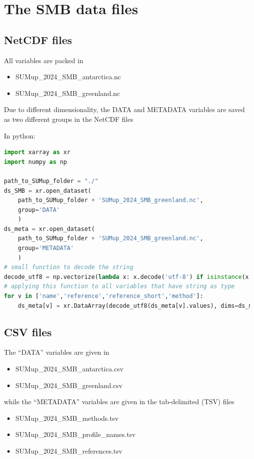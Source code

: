\documentclass[journal abbreviation, manuscript]{copernicus}
\begin{document}


\section{The SMB data files}
\subsection{NetCDF files}

All variables are packed in 

\begin{itemize}
\item SUMup\_2024\_SMB\_antarctica.nc
\item SUMup\_2024\_SMB\_greenland.nc
\end{itemize}
Due to different dimensionality, the DATA and METADATA variables are saved as two different groups in the NetCDF files

In python:
\begin{lstlisting}[language=python]
import xarray as xr
import numpy as np

path_to_SUMup_folder = "./"
ds_SMB = xr.open_dataset(
    path_to_SUMup_folder + 'SUMup_2024_SMB_greenland.nc', 
    group='DATA'
    )
ds_meta = xr.open_dataset(
    path_to_SUMup_folder + 'SUMup_2024_SMB_greenland.nc',
    group='METADATA'
    )
# small function to decode the string
decode_utf8 = np.vectorize(lambda x: x.decode('utf-8') if isinstance(x, bytes) else x)
# applying this function to all variables that have string as type
for v in ['name','reference','reference_short','method']:
    ds_meta[v] = xr.DataArray(decode_utf8(ds_meta[v].values), dims=ds_meta[v].dims)
\end{lstlisting} 

\subsection{CSV files}
The “DATA” variables are given in 
\begin{itemize}
\item SUMup\_2024\_SMB\_antarctica.csv 
\item SUMup\_2024\_SMB\_greenland.csv 
\end{itemize}
while the “METADATA” variables are given in the tab-delimited (TSV) files
\begin{itemize}
\item SUMup\_2024\_SMB\_methods.tsv
\item SUMup\_2024\_SMB\_profile\_names.tsv
\item SUMup\_2024\_SMB\_references.tsv
\end{itemize}
\end{document}
